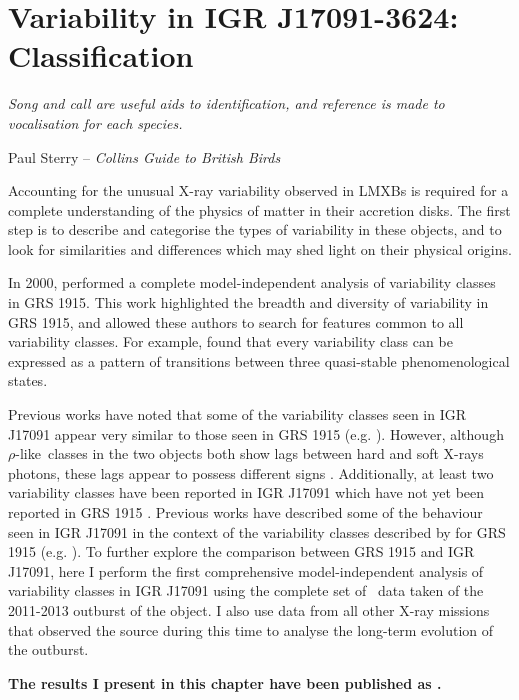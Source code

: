 \chapter{Variability in IGR J17091-3624: Classification}

\label{ch:IGR}

\epigraph{\textit{Song and call are useful aids to identification, and reference is made to vocalisation for each species.}}{Paul Sterry -- \textit{Collins Guide to British Birds}}

\vspace{1cm}

\par\noindent Accounting for the unusual X-ray variability observed in LMXBs is required for a complete understanding of the physics of matter in their accretion disks.  The first step is to describe and categorise the types of variability in these objects, and to look for similarities and differences which may shed light on their physical origins.
\par In 2000, \citeauthor{Belloni_GRS_MI} performed a complete model-independent analysis of variability classes in GRS 1915.  This work highlighted the breadth and diversity of variability in GRS 1915, and allowed these authors to search for features common to all variability classes.  For example, \citet{Belloni_GRS_MI} found that every variability class can be expressed as a pattern of transitions between three quasi-stable phenomenological states.
\par Previous works have noted that some of the variability classes seen in IGR J17091 appear very similar to those seen in GRS 1915 (e.g. \citealp{Altamirano_IGR_FH, Zhang_IGR}).  However, although $\rho$-like\indexrho\ classes in the two objects both show lags between hard and soft X-rays photons, these lags appear to possess different signs \citep{Altamirano_IGR_FH}.  Additionally, at least two variability classes have been reported in IGR J17091 which have not yet been reported in GRS 1915 \citep{Pahari_IGRClasses}.  Previous works have described some of the behaviour seen in IGR J17091 in the context of the variability classes described by \citealt{Belloni_GRS_MI} for GRS 1915 (e.g. \citealp{Altamirano_IGR_FH,Pahari_RhoDiff}).  To further explore the comparison between GRS 1915 and IGR J17091, here I perform the first comprehensive model-independent analysis of variability classes in IGR J17091 using the complete set of \indexrxte\rxte\ data taken of the 2011-2013 outburst of the object.  I also use data from all other X-ray missions that observed the source during this time to analyse the long-term evolution of the outburst.
\par \textbf{The results I present in this chapter have been published as \citet{IGR}.}

